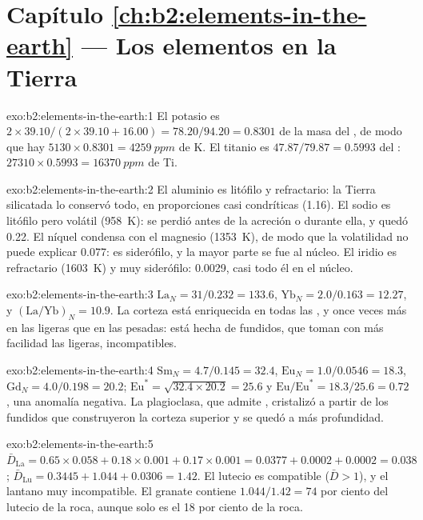 \section*{Capítulo \ref{ch:b2:elements-in-the-earth} --- Los elementos en la Tierra}

\begin{solution}{exo:b2:elements-in-the-earth:1}
El potasio es $2\times39.10/(2\times39.10+16.00) = 78.20/94.20 = 0.8301$ de la masa del
, de modo que hay $\num{5130}\times0.8301 = \qty{4259}{ppm}$ de K. El titanio es
$47.87/79.87 = 0.5993$ del : $\num{27310}\times0.5993 = \qty{16370}{ppm}$ de Ti.
\end{solution}

\begin{solution}{exo:b2:elements-in-the-earth:2}
El aluminio es litófilo y refractario: la Tierra silicatada lo conservó todo, en proporciones casi
condríticas (1.16). El sodio es litófilo pero volátil (\qty{958}{K}): se
perdió antes de la acreción o durante ella, y quedó 0.22. El níquel condensa con el magnesio
(\qty{1353}{K}), de modo que la volatilidad no puede explicar 0.077: es siderófilo, y la mayor parte
se fue al núcleo. El iridio es refractario (\qty{1603}{K}) y muy siderófilo:
0.0029, casi todo él en el núcleo.
\end{solution}

\begin{solution}{exo:b2:elements-in-the-earth:3}
$\mathrm{La}_N = 31/0.232 = 133.6$, $\mathrm{Yb}_N = 2.0/0.163 = 12.27$, y
$(\mathrm{La}/\mathrm{Yb})_N = 10.9$. La corteza está enriquecida en todas las , y
once veces más en las ligeras que en las pesadas: está hecha de fundidos, que
toman con más facilidad las  ligeras, incompatibles.
\end{solution}

\begin{solution}{exo:b2:elements-in-the-earth:4}
$\mathrm{Sm}_N = 4.7/0.145 = 32.4$, $\mathrm{Eu}_N = 1.0/0.0546 = 18.3$,
$\mathrm{Gd}_N = 4.0/0.198 = 20.2$; $\mathrm{Eu}^* = \sqrt{32.4\times20.2} = 25.6$ y
$\mathrm{Eu}/\mathrm{Eu}^* = 18.3/25.6 = 0.72$, una anomalía negativa. La plagioclasa, que
admite , cristalizó a partir de los fundidos que construyeron la corteza superior y se quedó
a más profundidad.
\end{solution}

\begin{solution}{exo:b2:elements-in-the-earth:5}
$\bar D_{\mathrm{La}} = 0.65\times0.058+0.18\times0.001+0.17\times0.001 = 0.0377 +
0.0002 + 0.0002 = 0.038$; $\bar D_{\mathrm{Lu}} = 0.3445+1.044+0.0306 = 1.42$. El lutecio es
compatible ($\bar D > 1$), y el lantano muy incompatible. El granate contiene
$1.044/1.42 = 74$ por ciento del lutecio de la roca, aunque solo es el 18 por ciento de la
roca.
\end{solution}

